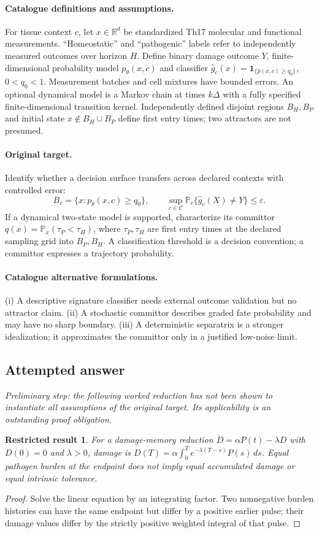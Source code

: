 \documentclass[11pt]{article}
\newcommand{\R}{\mathbb R}
\newcommand{\Prob}{\mathbb P}
\providecommand{\R}{\mathbb R}
\providecommand{\Prob}{\mathbb P}
\newtheorem{attemptresult}{Restricted result}[section]
\begin{document}
\paragraph{Catalogue definitions and assumptions.}
For tissue context $c$, let $x\in\R^d$ be standardized Th17 molecular and functional measurements. ``Homeostatic'' and ``pathogenic'' labels refer to independently measured outcomes over horizon $H$. Define binary damage outcome $Y$, finite-dimensional probability model $p_\theta(x,c)$ and classifier $\widehat g_c(x)=\mathbf1_{\{\widehat p(x,c)\geq q_0\}}$, $0<q_0<1$. Measurement batches and cell mixtures have bounded errors. An optional dynamical model is a Markov chain at times $k\Delta$ with a fully specified finite-dimensional transition kernel. Independently defined disjoint regions $B_H,B_P$ and initial state $x\notin B_H\cup B_P$ define first entry times; two attractors are not presumed.
\paragraph{Original target.}
Identify whether a decision surface transfers across declared contexts with controlled error:
\[B_c=\{x:p_\theta(x,c)\geq q_0\},\qquad
\sup_{c\in\mathcal C}\Prob_c\{\widehat g_c(X)\neq Y\}\leq\varepsilon.\]
If a dynamical two-state model is supported, characterize its committor $q(x)=\Prob_x(\tau_P<\tau_H)$, where $\tau_P,\tau_H$ are first entry times at the declared sampling grid into $B_P,B_H$. A classification threshold is a decision convention; a committor expresses a trajectory probability.
\paragraph{Catalogue alternative formulations.}
(i) A descriptive signature classifier needs external outcome validation but no attractor claim. (ii) A stochastic committor describes graded fate probability and may have no sharp boundary. (iii) A deterministic separatrix is a stronger idealization; it approximates the committor only in a justified low-noise limit.
\subsection{Attempted answer}
\noindent\emph{Preliminary step: the following worked reduction has not been shown to instantiate all assumptions of the original target. Its applicability is an outstanding proof obligation.}

\begin{attemptresult}
For a damage-memory reduction $\dot D=\alpha P(t)-\lambda D$ with $D(0)=0$ and $\lambda>0$, damage is $D(T)=\alpha\int_0^T e^{-\lambda(T-s)}P(s)\,ds$. Equal pathogen burden at the endpoint does not imply equal accumulated damage or equal intrinsic tolerance.
\end{attemptresult}
\begin{proof}
Solve the linear equation by an integrating factor. Two nonnegative burden histories can have the same endpoint but differ by a positive earlier pulse; their damage values differ by the strictly positive weighted integral of that pulse.
\end{proof}
\end{document}
